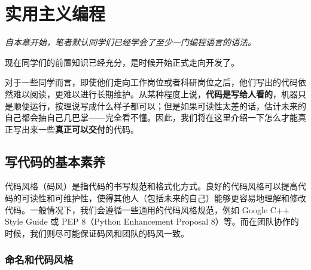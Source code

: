\documentclass[../main.tex]{subfiles}
\begin{document}
\chapter{实用主义编程}

\begin{flushright}
    \emph{自本章开始，笔者默认同学们已经学会了至少一门编程语言的语法。}
\end{flushright}

现在同学们的前置知识已经充分，是时候开始正式走向开发了。

对于一些同学而言，即使他们走向工作岗位或者科研岗位之后，他们写出的代码依然难以阅读，更难以进行长期维护。从某种程度上说，\textbf{代码是写给人看的}，机器只是顺便运行，按理说写成什么样子都可以；但是如果可读性太差的话，估计未来的自己都会抽自己几巴掌——完全看不懂。因此，我们将在这里介绍一下怎么才能真正写出来一些\textbf{真正可以交付}的代码。

\section{写代码的基本素养}\label{sec:code-style}

代码风格（码风）是指代码的书写规范和格式化方式。良好的代码风格可以提高代码的可读性和可维护性，使得其他人（包括未来的自己）能够更容易地理解和修改代码。一般情况下，我们会遵循一些通用的代码风格规范，例如 Google C++ Style Guide 或 PEP 8（Python Enhancement Proposal 8）等。而在团队协作的时候，我们则尽可能保证码风和团队的码风一致。

\subsection{命名和代码风格}
\end{document}
